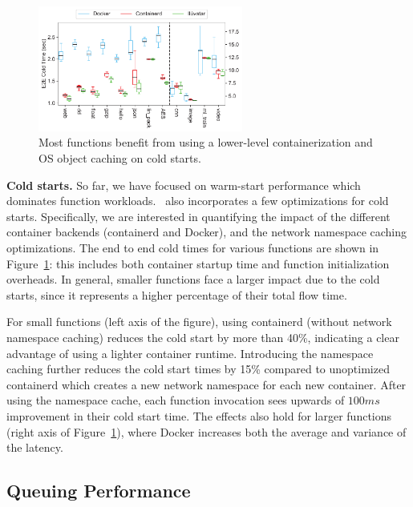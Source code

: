 
\begin{figure}
  \centering
  \includegraphics[width=0.6\textwidth]{iluvatar/graphs/impl/benchmark_cold_e2e.pdf}
  \caption{Most functions benefit from using a lower-level containerization and OS object caching on cold starts.}
  \label{fig:cold}
\end{figure}

\noindent \textbf{Cold starts.}
So far, we have focused on warm-start performance which dominates function workloads.
\sysname~also incorporates a few optimizations for cold starts. 
Specifically, we are interested in quantifying the impact of the different container backends (containerd and Docker), and the network namespace caching optimizations. 
The end to end cold times for various functions are shown in Figure~\ref{fig:cold}: this includes both container startup time and function initialization overheads. 
In general, smaller functions face a larger impact due to the cold starts, since it represents a higher percentage of their total flow time. 


For small functions (left axis of the figure), using containerd (without network namespace caching) reduces the cold start by more than 40\%, indicating a clear advantage of using a lighter container runtime.
Introducing the namespace caching further reduces the cold start times by 15\% compared to unoptimized containerd which creates a new network namespace for each new container. 
After using the namespace cache, each function invocation sees upwards of $100 ms$ improvement in their cold start time.
%
The effects also hold for larger functions (right axis of Figure~\ref{fig:cold}), where Docker increases both the average and variance of the latency. 

\subsection{Queuing Performance}
\label{sec:eval:q}

